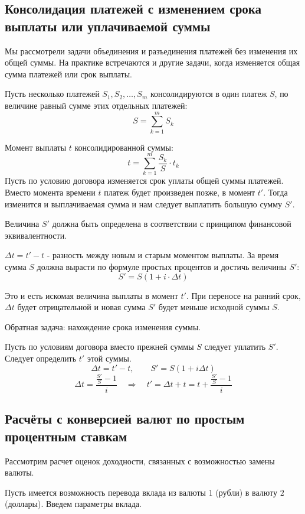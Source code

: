 \documentclass[aps,%
12pt,%
final,%
oneside,
onecolumn,%
musixtex, %
superscriptaddress,%
centertags]{article} %
\theoremstyle{plain}
\theoremstyle{definition}
\theoremstyle{remark}
\begin{document}

\subsection{Консолидация платежей с изменением срока выплаты или уплачиваемой суммы}

Мы рассмотрели задачи объединения и разъединения платежей без изменения их общей суммы. На практике встречаются и другие задачи, когда изменяется общая сумма платежей или срок выплаты.

Пусть несколько платежей $S_1,S_2,\ldots,S_m$ консолидируются в один платеж $S$, по величине равный сумме этих отдельных платежей:
$$S = \sum\limits_{k=1}^m S_k$$

Момент выплаты $t$ консолидированной суммы:
$$t = \sum\limits_{k=1}^m \frac{S_k}{S} \cdot t_k$$
Пусть по условию договора изменяется срок уплаты общей суммы платежей. Вместо момента времени $t$ платеж будет произведен позже, в момент $t'$. Тогда изменится и выплачиваемая сумма и нам следует выплатить большую сумму $S'$.

Величина $S'$ должна быть определена в соответствии с принципом финансовой эквивалентности.

$\Delta t = t' - t$ - разность между новым и старым моментом выплаты. За время сумма $S$ должна вырасти по формуле простых процентов и достичь величины $S'$:
$$S' = S(1+i\cdot \Delta t)$$

Это и есть искомая величина выплаты в момент $t'$. При переносе на ранний срок, $\Delta t$ будет отрицательной  и новая сумма $S'$ будет меньше исходной суммы $S$.

Обратная задача: нахождение срока изменения суммы.

Пусть по условиям договора вместо прежней суммы $S$ следует уплатить $S'$. Следует определить $t'$ этой суммы.
$$\Delta t = t' - t, \qquad S' = S(1+i\Delta t)$$
$$\Delta t = \frac{\frac{S'}{S} - 1}{i} \quad \Longrightarrow \quad t' = \Delta t + t = t + \frac{\frac{S'}{S} - 1}{i}$$


\subsection{Расчёты с конверсией валют по простым процентным ставкам }

Рассмотрим расчет оценок доходности, связанных с возможностью замены валюты.

Пусть имеется возможность перевода вклада из валюты $1$ (рубли) в валюту $2$ (доллары). Введем параметры вклада.
\end{document}
